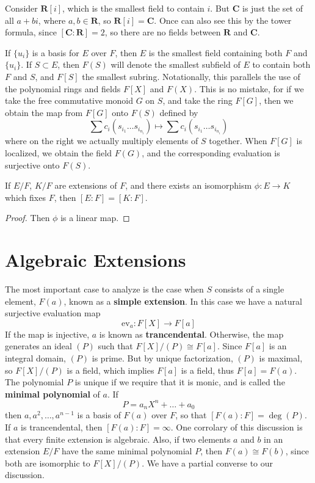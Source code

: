 \begin{example}
    Consider $\mathbf{R}[i]$, which is the smallest field to contain $i$. But $\mathbf{C}$ is just the set of all $a + bi$, where $a,b \in \mathbf{R}$, so $\mathbf{R}[i] = \mathbf{C}$. Once can also see this by the tower formula, since $[\mathbf{C}: \mathbf{R}] = 2$, so there are no fields between $\mathbf{R}$ and $\mathbf{C}$.
\end{example}

If $\{ u_i \}$ is a basis for $E$ over $F$, then $E$ is the smallest field containing both $F$ and $\{ u_i \}$. If $S \subset E$, then $F(S)$ will denote the smallest subfield of $E$ to contain both $F$ and $S$, and $F[S]$ the smallest subring. Notationally, this parallels the use of the polynomial rings and fields $F[X]$ and $F(X)$. This is no mistake, for if we take the free commutative monoid $G$ on $S$, and take the ring $F[G]$, then we obtain the map from $F[G]$ onto $F(S)$ defined by
%
\[ \sum c_i (s_{i_1} \dots s_{i_{n_i}}) \mapsto \sum c_i (s_{i_1} \dots s_{i_{n_i}}) \]
%
where on the right we actually multiply elements of $S$ together. When $F[G]$ is localized, we obtain the field $F(G)$, and the corresponding evaluation is surjective onto $F(S)$.

\begin{lemma}
    If $E/F$, $K/F$ are extensions of $F$, and there exists an isomorphism $\phi: E \to K$ which fixes $F$, then $[E:F] = [K:F]$.
\end{lemma}
\begin{proof}
    Then $\phi$ is a linear map.
\end{proof}

\section{Algebraic Extensions}

The most important case to analyze is the case when $S$ consists of a single element, $F(a)$, known as a {\bf simple extension}. In this case we have a natural surjective evaluation map
%
\[ \text{ev}_a: F[X] \to F[a] \]
%
If the map is injective, $a$ is known as {\bf trancendental}. Otherwise, the map generates an ideal $(P)$ such that $F[X]/(P) \cong F[a]$. Since $F[a]$ is an integral domain, $(P)$ is prime. But by unique factorization, $(P)$ is maximal, so $F[X]/(P)$ is a field, which implies $F[a]$ is a field, thus $F[a] = F(a)$. The polynomial $P$ is unique if we require that it is monic, and is called the {\bf minimal polynomial} of $a$. If
%
\[ P = a_n X^n + \dots + a_0 \]
%
then $a, a^2, \dots, a^{n-1}$ is a basis of $F(a)$ over $F$, so that $[F(a):F] = \deg(P)$. If $a$ is trancendental, then $[F(a):F] = \infty$. One corrolary of this discussion is that every finite extension is algebraic. Also, if two elements $a$ and $b$ in an extension $E/F$ have the same minimal polynomial $P$, then $F(a) \cong F(b)$, since both are isomorphic to $F[X]/(P)$. We have a partial converse to our discussion.


